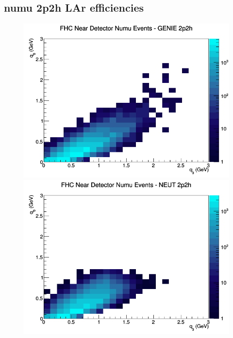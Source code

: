 \subsection{numu 2p2h LAr efficiencies}
\begin{figure}[h]
\includegraphics[width=\linewidth]{eff_q0_q3/LAr/2p2h_FHC_ND_numu_q3_q0_GENIE.png}
\endminipage
{}
\includegraphics[width=\linewidth]{eff_q0_q3/LAr/2p2h_FHC_ND_numu_q3_q0_NEUT.png}
\endminipage
{}

\end{figure}
